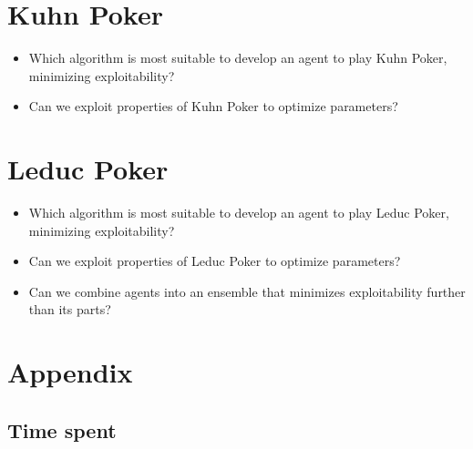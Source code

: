 \documentclass[10pt,a4paper]{article}
\begin{document}
\section{Kuhn Poker}
\begin{tcolorbox}
\begin{itemize}
\item{Which algorithm is most suitable to develop an agent to play Kuhn Poker, minimizing exploitability?}
\item{Can we exploit properties of Kuhn Poker to optimize parameters?}
\end{itemize}
\end{tcolorbox}

\section{Leduc Poker}
\begin{tcolorbox}
\begin{itemize}
\item{Which algorithm is most suitable to develop an agent to play Leduc Poker, minimizing exploitability?}
\item{Can we exploit properties of Leduc Poker to optimize parameters?}
\item{Can we combine agents into an ensemble that minimizes exploitability further than its parts?}
\end{itemize}
\end{tcolorbox}




\section*{Appendix}
\subsection{Time spent}
\end{document}
